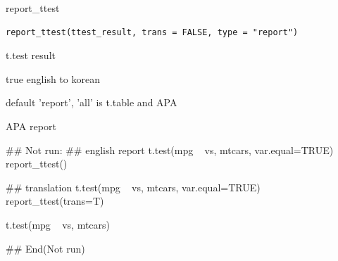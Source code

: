 \documentclass[a4paper]{book}
\begin{document}
%
\begin{Description}
report\_ttest
\end{Description}
%
\begin{Usage}
\begin{verbatim}
report_ttest(ttest_result, trans = FALSE, type = "report")
\end{verbatim}
\end{Usage}
%
\begin{Arguments}
\begin{ldescription}
\item[\code{ttest\_result}] t.test result

\item[\code{trans}] true english to korean

\item[\code{type}] default 'report', 'all' is t.table and APA
\end{ldescription}
\end{Arguments}
%
\begin{Value}
APA report
\end{Value}
%
\begin{Examples}
\begin{ExampleCode}
\#\# Not run: 
## english report
t.test(mpg ~ vs, mtcars, var.equal=TRUE) %
        report_ttest()

## translation
t.test(mpg ~ vs, mtcars, var.equal=TRUE) %
report_ttest(trans=T)

t.test(mpg ~ vs, mtcars) %

## End(Not run)
\end{ExampleCode}
\end{Examples}
\end{document}
